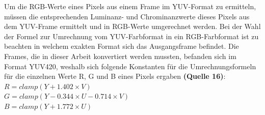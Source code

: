 Um die RGB-Werte eines Pixels aus einem Frame im YUV-Format zu ermitteln, müssen die entsprechenden Luminanz- und Chrominanzwerte dieses Pixels aus dem YUV-Frame ermittelt und in RGB-Werte umgerechnet werden. Bei der Wahl der Formel zur Umrechnung vom YUV-Farbformat in ein RGB-Farbformat ist zu beachten in welchem exakten Format sich das Ausgangsframe befindet. Die Frames, die in dieser Arbeit konvertiert werden mussten, befanden sich im Format YUV420, weshalb sich folgende Konstanten für die Umrechnungsformeln für die einzelnen Werte R, G und B eines Pixels ergaben \textbf{(Quelle 16)}:
\\

$R = clamp(Y + 1.402 \times V) $\\
$G = clamp(Y - 0.344 \times U - 0.714 \times V) $\\
$B = clamp(Y + 1.772 \times U) $\\